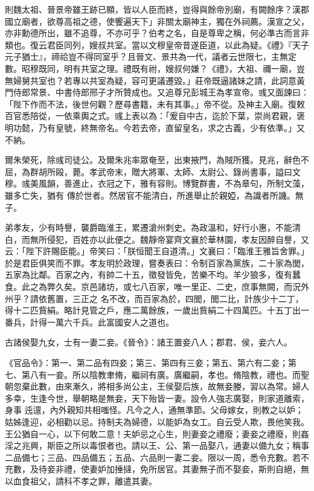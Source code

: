 \begin{pinyinscope}
 則魏太祖、晉景帝雖王跡已顯，皆以人臣而終，豈得與餘帝別廟，有闕餘序？漢郡國立廟者，欲尊高祖之德，使饗遍天下」非關太廟神主，獨在外祠薦。漢宣之父，亦非勳德所出，雖不追尊，不亦可乎？伯考之名，自是尊卑之稱，何必準古而言非類也。復云君臣同列，嫂叔共室。當以文穆皇帝昔遂臣道，以此為疑。《禮》『天子元子猶士』，禘祫豈不得同室乎？且晉文、景共為一代，議者云世限七，主無定數。昭穆既同，明有共室之理。禮既有祔，嫂叔何嫌？《禮》，大祖、禰一廟，豈無婦舅共室也？若專以共室為疑，容可更議遷毀。」莊帝既逼諸妹之請，此詞意黃
 門侍郎常景、中書侍郎邢子才所贊成也。又追尊兄彭城王為孝宣帝。彧又面諫曰：「陛下作而不法，後世何觀？歷尋書籍，未有其事。」帝不從。及神主入廟。復敕百官悉陪從，一依乘輿之式。彧上表以為：「爰自中古，迄於下葉，崇尚君親，褒明功懿，乃有皇號，終無帝名。今若去帝，直留皇名，求之古義，少有依準。」又不納。



 爾朱榮死，除彧司徒公。及爾朱兆率眾奄至，出東掖門，為賊所獲。見兆，辭色不屈，為群胡所毆，薨。孝武帝末，贈大將軍、太師、太尉公、錄尚書事，謚曰文穆。彧美風韻，善進止，衣冠之下，雅有容則。博覽群書，不為章句，所制文藻，雖多亡失，猶有
 傳於世者。然居官不能清白，所進舉止於親婭，為識者所譏。無子。



 弟孝友，少有時譽，襲爵臨淮王，累遷滄州刺史。為政溫和，好行小惠，不能清白，而無所侵犯，百姓亦以此便之。魏靜帝宴齊文襄於華林園，孝友因醉自譽，又云：「陛下許賜臣能。」帝笑曰：「朕恒聞王自道清。」文襄曰：「臨淮王雅旨舍罪。」於是君臣俱笑而不罪。孝友明於政理，嘗奏表曰：令制百家為黨族，二十家為閭，五家為比鄰。百家之內，有帥二十五，徵發皆免，苦樂不均。羊少狼多，復有蠶食。此之為弊久矣。京邑諸坊，或七八百家，唯一里正、二史，庶事無闕，而況外州乎？請依舊置，三正之
 名不改，而百家為於，四閭，閭二比，計族少十二丁，得十二匹貲絹。略計見管之戶，應二萬餘族，一歲出貲絹二十四萬匹。十五丁出一番兵，計得一萬六千兵。此富國安人之道也。



 古諸侯娶九女，士有一妻二妾。《晉令》：諸王置妾八人；郡君、侯，妾六人。



 《官品令》：第一、第二品有四妾；第三、第四有三妾；第五、第六有二妾；第七、第八有一妾。所以陰教聿脩，繼祠有廣。廣繼嗣，孝也。脩陰教，禮也。而聖朝忽棄此數，由來漸久，將相多尚公主，王侯娶后族，故無妾媵，習以為常。婦人多幸，生逢今世，舉朝略是無妾，天下殆皆一妻。設令人強志廣娶，則家道離索，身事
 迍邅，內外親知共相嗤怪。凡今之人，通無準節。父母嫁女，則教之以妒；姑姊逢迎，必相勸以忌。持制夫為婦德，以能妒為女工。自云受人欺，畏他笑我。王公猶自一心，以下何敢二意！夫妒忌之心生，則妻妾之禮廢；妻妾之禮廢，則姦淫之兆興，斯臣之所以毒恨者也。請以王、公、第一品娶八，通妻以備九女；稱事二品備七；三品、四品備五；五品、六品則一妻二妾。限以一周，悉令充數。若不充數，及待妾非禮，使妻妒加捶撻，免所居官。其妻無子而不娶妾，斯則自絕，無以血食祖父，請科不孝之罪，離遣其妻。




\end{pinyinscope}
